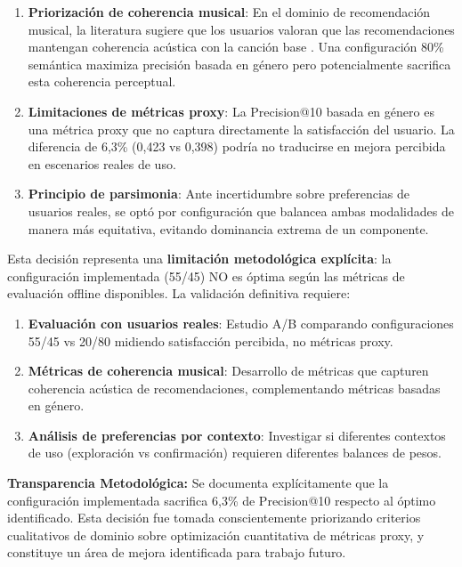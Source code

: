 \begin{enumerate}
    \item \textbf{Priorización de coherencia musical}: En el dominio de recomendación musical, la literatura sugiere que los usuarios valoran que las recomendaciones mantengan coherencia acústica con la canción base \citep{celma2010music,schedl2015music}. Una configuración 80\% semántica maximiza precisión basada en género pero potencialmente sacrifica esta coherencia perceptual.

    \item \textbf{Limitaciones de métricas proxy}: La Precision@10 basada en género es una métrica proxy que no captura directamente la satisfacción del usuario. La diferencia de 6,3\% (0,423 vs 0,398) podría no traducirse en mejora percibida en escenarios reales de uso.

    \item \textbf{Principio de parsimonia}: Ante incertidumbre sobre preferencias de usuarios reales, se optó por configuración que balancea ambas modalidades de manera más equitativa, evitando dominancia extrema de un componente.
\end{enumerate}

\begin{tcolorbox}[colback=yellow!10, colframe=orange!80!black, title=Limitación del Estudio]
Esta decisión representa una \textbf{limitación metodológica explícita}: la configuración implementada (55/45) NO es óptima según las métricas de evaluación offline disponibles. La validación definitiva requiere:

\begin{enumerate}
    \item \textbf{Evaluación con usuarios reales}: Estudio A/B comparando configuraciones 55/45 vs 20/80 midiendo satisfacción percibida, no métricas proxy.
    \item \textbf{Métricas de coherencia musical}: Desarrollo de métricas que capturen coherencia acústica de recomendaciones, complementando métricas basadas en género.
    \item \textbf{Análisis de preferencias por contexto}: Investigar si diferentes contextos de uso (exploración vs confirmación) requieren diferentes balances de pesos.
\end{enumerate}
\end{tcolorbox}

\textbf{Transparencia Metodológica:} Se documenta explícitamente que la configuración implementada sacrifica 6,3\% de Precision@10 respecto al óptimo identificado. Esta decisión fue tomada conscientemente priorizando criterios cualitativos de dominio sobre optimización cuantitativa de métricas proxy, y constituye un área de mejora identificada para trabajo futuro.


